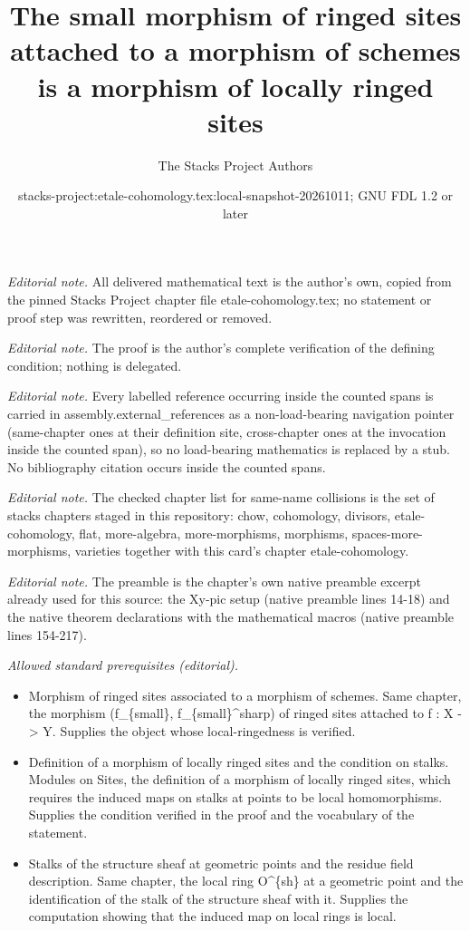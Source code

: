 \documentclass[10pt,a4paper]{amsart}
\title{The small morphism of ringed sites attached to a morphism of schemes is a morphism of locally ringed sites}
\author{The Stacks Project Authors}
\date{stacks-project:etale-cohomology.tex:local-snapshot-20261011; GNU FDL 1.2 or later}
\theoremstyle{plain}
\theoremstyle{definition}
\theoremstyle{remark}
\numberwithin{equation}{subsection}
\begin{document}
\maketitle
\noindent\textit{Editorial note.} All delivered mathematical text is the author's own, copied from the pinned Stacks Project chapter file etale-cohomology.tex; no statement or proof step was rewritten, reordered or removed.\par\medskip
\noindent\textit{Editorial note.} The proof is the author's complete verification of the defining condition; nothing is delegated.\par\medskip
\noindent\textit{Editorial note.} Every labelled reference occurring inside the counted spans is carried in assembly.external\_references as a non-load-bearing navigation pointer (same-chapter ones at their definition site, cross-chapter ones at the invocation inside the counted span), so no load-bearing mathematics is replaced by a stub. No bibliography citation occurs inside the counted spans.\par\medskip
\noindent\textit{Editorial note.} The checked chapter list for same-name collisions is the set of stacks chapters staged in this repository: chow, cohomology, divisors, etale-cohomology, flat, more-algebra, more-morphisms, morphisms, spaces-more-morphisms, varieties together with this card's chapter etale-cohomology.\par\medskip
\noindent\textit{Editorial note.} The preamble is the chapter's own native preamble excerpt already used for this source: the Xy-pic setup (native preamble lines 14-18) and the native theorem declarations with the mathematical macros (native preamble lines 154-217).\par\medskip
\noindent\textit{Allowed standard prerequisites (editorial).}\begin{itemize}
\item Morphism of ringed sites associated to a morphism of schemes. Same chapter, the morphism (f\_\{small\}, f\_\{small\}\textasciicircum{}sharp) of ringed sites attached to f : X -> Y. Supplies the object whose local-ringedness is verified.
\item Definition of a morphism of locally ringed sites and the condition on stalks. Modules on Sites, the definition of a morphism of locally ringed sites, which requires the induced maps on stalks at points to be local homomorphisms. Supplies the condition verified in the proof and the vocabulary of the statement.
\item Stalks of the structure sheaf at geometric points and the residue field description. Same chapter, the local ring O\textasciicircum{}\{sh\} at a geometric point and the identification of the stalk of the structure sheaf with it. Supplies the computation showing that the induced map on local rings is local.
\end{itemize}\medskip
\end{document}
